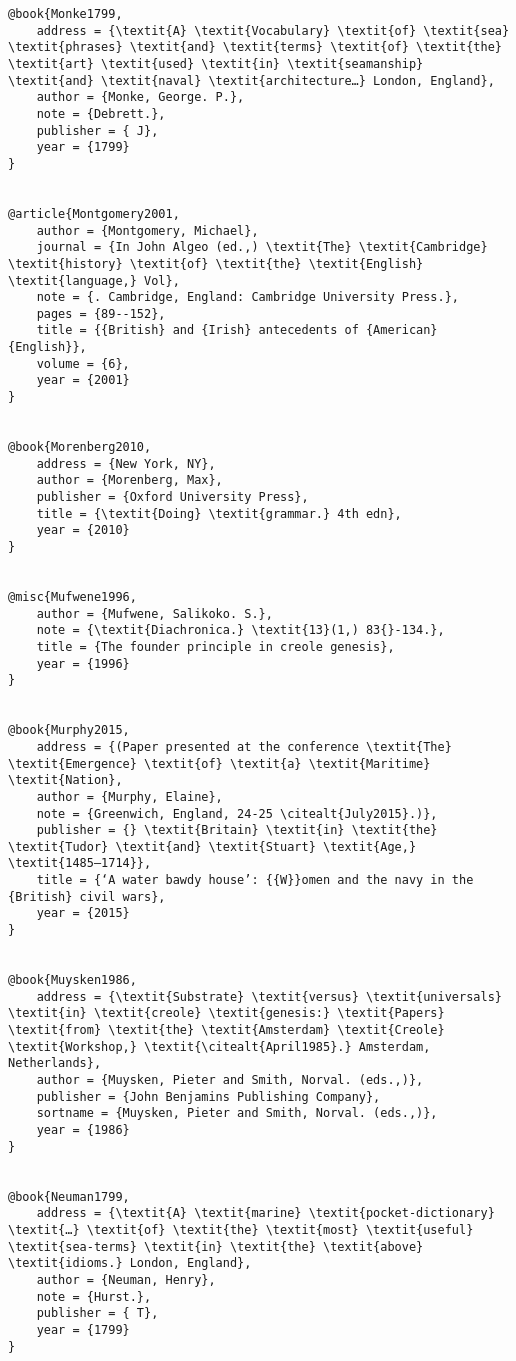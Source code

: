 \begin{verbatim}
@book{Monke1799,
	address = {\textit{A} \textit{Vocabulary} \textit{of} \textit{sea} \textit{phrases} \textit{and} \textit{terms} \textit{of} \textit{the} \textit{art} \textit{used} \textit{in} \textit{seamanship} \textit{and} \textit{naval} \textit{architecture…} London, England},
	author = {Monke, George. P.},
	note = {Debrett.},
	publisher = { J},
	year = {1799}
}


@article{Montgomery2001,
	author = {Montgomery, Michael},
	journal = {In John Algeo (ed.,) \textit{The} \textit{Cambridge} \textit{history} \textit{of} \textit{the} \textit{English} \textit{language,} Vol},
	note = {. Cambridge, England: Cambridge University Press.},
	pages = {89--152},
	title = {{British} and {Irish} antecedents of {American} {English}},
	volume = {6},
	year = {2001}
}


@book{Morenberg2010,
	address = {New York, NY},
	author = {Morenberg, Max},
	publisher = {Oxford University Press},
	title = {\textit{Doing} \textit{grammar.} 4th edn},
	year = {2010}
}


@misc{Mufwene1996,
	author = {Mufwene, Salikoko. S.},
	note = {\textit{Diachronica.} \textit{13}(1,) 83{}-134.},
	title = {The founder principle in creole genesis},
	year = {1996}
}


@book{Murphy2015,
	address = {(Paper presented at the conference \textit{The} \textit{Emergence} \textit{of} \textit{a} \textit{Maritime} \textit{Nation},
	author = {Murphy, Elaine},
	note = {Greenwich, England, 24-25 \citealt{July2015}.)},
	publisher = {} \textit{Britain} \textit{in} \textit{the} \textit{Tudor} \textit{and} \textit{Stuart} \textit{Age,} \textit{1485–1714}},
	title = {‘A water bawdy house’: {{W}}omen and the navy in the {British} civil wars},
	year = {2015}
}


@book{Muysken1986,
	address = {\textit{Substrate} \textit{versus} \textit{universals} \textit{in} \textit{creole} \textit{genesis:} \textit{Papers} \textit{from} \textit{the} \textit{Amsterdam} \textit{Creole} \textit{Workshop,} \textit{\citealt{April1985}.} Amsterdam, Netherlands},
	author = {Muysken, Pieter and Smith, Norval. (eds.,)},
	publisher = {John Benjamins Publishing Company},
	sortname = {Muysken, Pieter and Smith, Norval. (eds.,)},
	year = {1986}
}


@book{Neuman1799,
	address = {\textit{A} \textit{marine} \textit{pocket-dictionary} \textit{…} \textit{of} \textit{the} \textit{most} \textit{useful} \textit{sea-terms} \textit{in} \textit{the} \textit{above} \textit{idioms.} London, England},
	author = {Neuman, Henry},
	note = {Hurst.},
	publisher = { T},
	year = {1799}
}



\end{verbatim}
